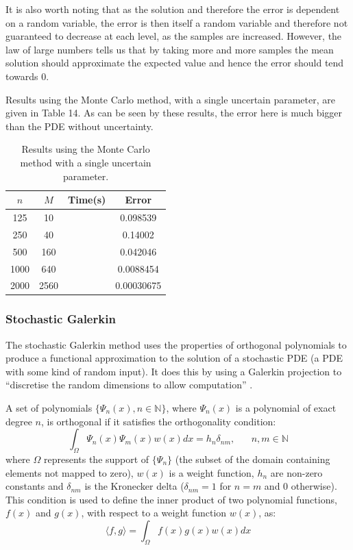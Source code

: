 \documentclass{article}
\numberwithin{equation}{section}
\begin{document}
It is also worth noting that as the solution and therefore the error is dependent on a random variable, the error is then itself a random variable and therefore not guaranteed to decrease at each level, as the samples are increased. However, the law of large numbers tells us that by taking more and more samples the mean solution should approximate the expected value and hence the error should tend towards 0. 

Results using the Monte Carlo method, with a single uncertain parameter, are given in Table 14. As can be seen by these results, the error here is much bigger than the PDE without uncertainty. 
\begin{table}[H]
\centering
\begin{tabular}{|c|c|c|c|}
\hline
$n$ & $M$ & Time(s) & Error \\
\hline
125 & 10 & & 0.098539 \\
250 & 40 & & 0.14002 \\
500 & 160 & & 0.042046 \\
1000 & 640 & & 0.0088454 \\
2000 & 2560 & & 0.00030675 \\
\hline
\end{tabular}
\captionsetup{justification=centering}
\caption{Results using the Monte Carlo method with a single uncertain parameter.}
\end{table}


\subsubsection{Stochastic Galerkin}
The stochastic Galerkin method uses the properties of orthogonal polynomials to produce a functional approximation to the solution of a stochastic PDE (a PDE with some kind of random input). It does this by using a Galerkin projection to ``discretise the random dimensions to allow computation'' \cite{Paul}. 

A set of polynomials $\{\Psi_n(x), n \in \mathbb{N}\}$, where $\Psi_n(x)$ is a polynomial of exact degree $n$, is orthogonal if it satisfies the orthogonality condition:
\begin{equation}
\int_{\Omega} \Psi_n(x) \Psi_m(x) w(x) dx = h_n \delta_{nm}, \;\;\;\;\;\; n,m \in \mathbb{N}
\end{equation} 
where $\Omega$ represents the support of $\{\Psi_n\}$ (the subset of the domain containing elements not mapped to zero), $w(x)$ is a weight function, $h_n$ are non-zero constants and $\delta_{nm}$ is the Kronecker delta ($\delta_{nm} = 1$ for $n=m$ and $0$ otherwise). This condition is used to define the inner product of two polynomial functions, $f(x)$ and $g(x)$, with respect to a weight function $w(x)$, as:
\begin{equation}
\langle f, g \rangle = \int_{\Omega} f(x)g(x)w(x) dx
\end{equation}
\end{document}
